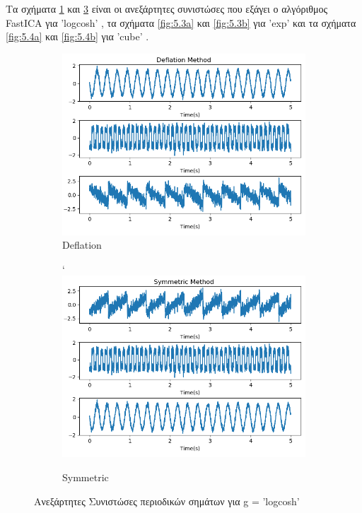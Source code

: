 \noindent Τα σχήματα \en \ref{fig:5.2a} \gr και \en \ref{fig:5.2b} \gr είναι οι ανεξάρτητες συνιστώσες που εξάγει ο αλγόριθμος \en FastICA \gr για \en 'logcosh' \gr, τα σχήματα \en \ref{fig:5.3a} \gr   και \en \ref{fig:5.3b} \gr  για \en 'exp' \gr και τα σχήματα \en \ref{fig:5.4a} \gr και \en \ref{fig:5.4b} \gr για \en 'cube' \gr.
\begin{figure}[H]
    \centering
    \begin{subfigure}{0.48 \textwidth}
        \centering
        \includegraphics[width=\textwidth]{fwto/defla_ica_1_logcosh.png} \en
        \caption{Deflation} \gr
        \label{fig:5.2a}
    \end{subfigure}%
    \hfill
    \begin{subfigure}{0.48 \textwidth}
        \centering
    `   \includegraphics[width=\textwidth]{fwto/Symmetric_ica_1_logcosh.png}
        \en
        \caption{Symmetric} \gr
        \label{fig:5.2b}
    \end{subfigure}%
    \gr
    \caption{Ανεξάρτητες Συνιστώσες περιοδικών σημάτων για \en g = 'logcosh' \gr}
\end{figure}
